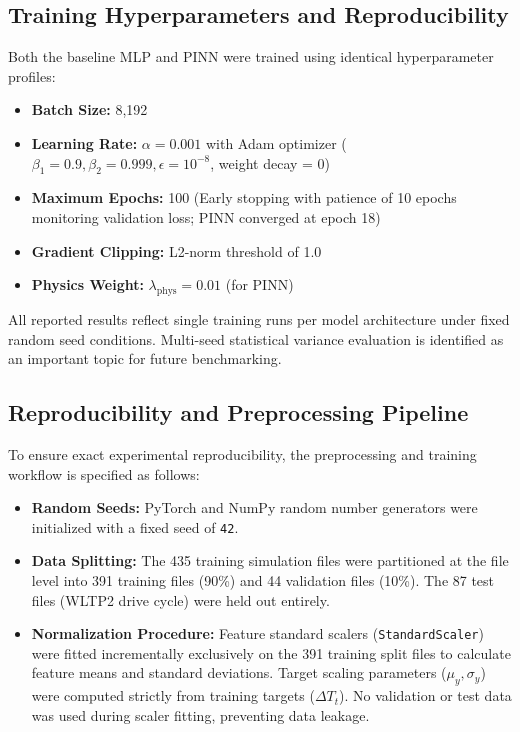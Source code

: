 \subsection{Training Hyperparameters and Reproducibility}
Both the baseline MLP and PINN were trained using identical hyperparameter profiles:
\begin{itemize}
    \item \textbf{Batch Size:} 8,192
    \item \textbf{Learning Rate:} $\alpha = 0.001$ with Adam optimizer ($\beta_1 = 0.9, \beta_2 = 0.999, \epsilon = 10^{-8}$, weight decay = $0$)
    \item \textbf{Maximum Epochs:} 100 (Early stopping with patience of 10 epochs monitoring validation loss; PINN converged at epoch 18)
    \item \textbf{Gradient Clipping:} L2-norm threshold of 1.0
    \item \textbf{Physics Weight:} $\lambda_{\text{phys}} = 0.01$ (for PINN)
\end{itemize}
All reported results reflect single training runs per model architecture under fixed random seed conditions. Multi-seed statistical variance evaluation is identified as an important topic for future benchmarking.

\subsection{Reproducibility and Preprocessing Pipeline}
To ensure exact experimental reproducibility, the preprocessing and training workflow is specified as follows:
\begin{itemize}
    \item \textbf{Random Seeds:} PyTorch and NumPy random number generators were initialized with a fixed seed of \texttt{42}.
    \item \textbf{Data Splitting:} The 435 training simulation files were partitioned at the file level into 391 training files (90\%) and 44 validation files (10\%). The 87 test files (WLTP2 drive cycle) were held out entirely.
    \item \textbf{Normalization Procedure:} Feature standard scalers (\texttt{StandardScaler}) were fitted incrementally exclusively on the 391 training split files to calculate feature means and standard deviations. Target scaling parameters ($\mu_y, \sigma_y$) were computed strictly from training targets ($\Delta T_t$). No validation or test data was used during scaler fitting, preventing data leakage.
\end{itemize}

